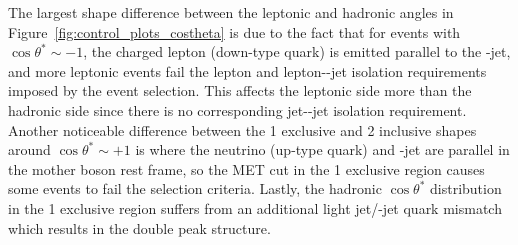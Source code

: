 The largest shape difference between the leptonic and hadronic angles in Figure~\ref{fig:control_plots_costheta} is due to the fact that for events with $\cos \theta^{*} \sim -1$, the charged lepton (down-type quark) is emitted parallel to the \bt-jet, and more leptonic events fail the lepton \pt and lepton-\bt-jet isolation requirements imposed by the event selection. This affects the leptonic side more than the hadronic side since there is no corresponding jet-\bt-jet isolation requirement. Another noticeable difference between the 1 exclusive and 2 inclusive shapes around $\cos \theta^{*} \sim +1$ is where the neutrino (up-type quark) and \bt-jet are parallel in the mother \w boson rest frame, so the MET cut in the 1 exclusive region causes some events to fail the selection criteria. Lastly, the hadronic $\cos \theta^{*}$ distribution in the 1 exclusive region suffers from an additional light jet/\bt-jet quark mismatch which results in the double peak structure.

